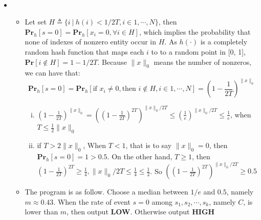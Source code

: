 \documentclass[12pt]{article}
\newenvironment{solution}[2][Solution]{\begin{trivlist}
\item[\hskip \labelsep {\bfseries #1}\hskip \labelsep {\bfseries #2.}]}{\end{trivlist}}
\begin{document}
\begin{solution}{2}
    ~
    \begin{itemize}
        \item \begin{itemize}
                  \item
                        Let set $H\triangleq \{i ~|~ h(i) < 1/2T, i \in 1,\cdots,N\}$, then $\mathbf{Pr}_{h}[s=0] = \mathbf{Pr}_h[x_i=0, \forall i \in H]$,
                        which implies the probability that none of indexes of nonzero entity occur in $H$.
                        As $h(\cdot)$ is a completely random hash function that maps each $i$ to to a random point in [0, 1], $\mathbf{Pr}[i \not \in H] = 1-1/2T$.
                        Because $\|x\|_0$ means the number of nonzeros, we can have that:
                        \[\mathbf{Pr}_{h}[s=0] = \mathbf{Pr}_{h}[\text{if~} x_i \neq 0, \text{then~} i \not \in H, i \in 1,\cdots,N] = (1-\frac{1}{2T})^{\|x\|_0}\]
                        \begin{enumerate}[(i)]
                            \item $(1-\frac{1}{2T})^{\|x\|_0} = ((1-\frac{1}{2T})^{2T})^{\|x\|_0/2T} \le (\frac1e)^{\|x\|_0/2T} \le \frac1e$, when $T \le \frac12\|x\|_0$
                            \item if $T > 2 \|x\|_0$, When $T < 1$, that is to say $\|x\|_0 = 0$, then $\mathbf{Pr}_{h}[s=0] = 1 > 0.5$. On the other hand, $T \ge 1$,
                                  then $(1-\frac{1}{2T})^{2T} \ge \frac14, \|x\|_0/2T \le \frac14 \le \frac12$. So $((1-\frac{1}{2T})^{2T})^{\|x\|_0/2T} \ge 0.5$
                        \end{enumerate}
                  \item The program is as follow. Choose a median between $1/e$ and $0.5$, namely $m \approx 0.43$. When the rate of event $s=0$ among $s_1,s_2,\cdots,s_k$, namely $C$, is lower than $m$,
                        then output \textbf{LOW}. Otherwise output \textbf{HIGH}


\end{itemize}
\end{itemize}
\end{solution}
\end{document}

